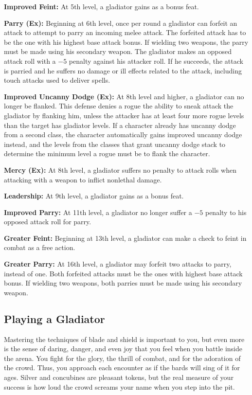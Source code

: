 \textbf{Improved Feint:} At 5th level, a gladiator gains  as a bonus feat.


\textbf{Parry (Ex):} Beginning at 6th level, once per round a gladiator can forfeit an attack to attempt to parry an incoming melee attack. The forfeited attack has to be the one with his highest base attack bonus. If wielding two weapons, the parry must be made using his secondary weapon. The gladiator makes an opposed attack roll with a $-5$ penalty against his attacker roll. If he succeeds, the attack is parried and he suffers no damage or ill effects related to the attack, including touch attacks used to deliver spells.

\textbf{Improved Uncanny Dodge (Ex):} At 8th level and higher, a gladiator can no longer be flanked. This defense denies a rogue the ability to sneak attack the gladiator by flanking him, unless the attacker has at least four more rogue levels than the target has gladiator levels. If a character already has uncanny dodge from a second class, the character automatically gains improved uncanny dodge instead, and the levels from the classes that grant uncanny dodge stack to determine the minimum level a rogue must be to flank the character.

\textbf{Mercy (Ex):} At 8th level, a gladiator suffers no penalty to attack rolls when attacking with a weapon to inflict nonlethal damage.

\textbf{Leadership:} At 9th level, a gladiator gains  as a bonus feat.

\textbf{Improved Parry:} At 11th level, a gladiator no longer suffer a $-5$ penalty to his opposed attack roll for parry.

\textbf{Greater Feint:} Beginning at 13th level, a gladiator can make a  check to feint in combat as a free action.

\textbf{Greater Parry:} At 16th level, a gladiator may forfeit two attacks to parry, instead of one. Both forfeited attacks must be the ones with highest base attack bonus. If wielding two weapons, both parries must be made using his secondary weapon.

\subsection{Playing a Gladiator}
Mastering the techniques of blade and shield is important to you, but even more is the sense of daring, danger, and even joy that you feel when you battle inside the arena. You fight for the glory, the thrill of combat, and for the adoration of the crowd. Thus, you approach each encounter as if the bards will sing of it for ages. Silver and concubines are pleasant tokens, but the real measure of your success is how loud the crowd screams your name when you step into the pit.

